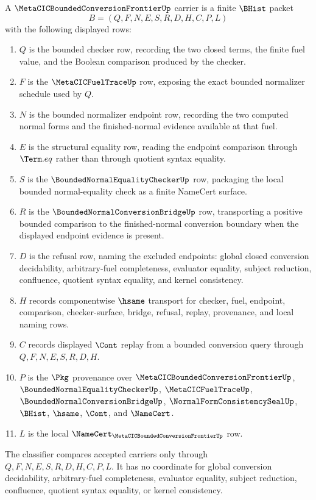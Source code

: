 \begin{definition}
\label{def:metacic-bounded-conversion-frontier-carrier}
A $\MetaCICBoundedConversionFrontierUp$ carrier is a finite $\BHist$ packet
$$
B=(Q,F,N,E,S,R,D,H,C,P,L)
$$
with the following displayed rows:
\begin{enumerate}
\item $Q$ is the bounded checker row, recording the two closed terms, the finite fuel value, and the Boolean comparison produced by the checker.
\item $F$ is the $\MetaCICFuelTraceUp$ row, exposing the exact bounded normalizer schedule used by $Q$.
\item $N$ is the bounded normalizer endpoint row, recording the two computed normal forms and the finished-normal evidence available at that fuel.
\item $E$ is the structural equality row, reading the endpoint comparison through $\Term.eq$ rather than through quotient syntax equality.
\item $S$ is the $\BoundedNormalEqualityCheckerUp$ row, packaging the local bounded normal-equality check as a finite NameCert surface.
\item $R$ is the $\BoundedNormalConversionBridgeUp$ row, transporting a positive bounded comparison to the finished-normal conversion boundary when the displayed endpoint evidence is present.
\item $D$ is the refusal row, naming the excluded endpoints: global closed conversion decidability, arbitrary-fuel completeness, evaluator equality, subject reduction, confluence, quotient syntax equality, and kernel consistency.
\item $H$ records componentwise $\hsame$ transport for checker, fuel, endpoint, comparison, checker-surface, bridge, refusal, replay, provenance, and local naming rows.
\item $C$ records displayed $\Cont$ replay from a bounded conversion query through $Q,F,N,E,S,R,D,H$.
\item $P$ is the $\Pkg$ provenance over $\MetaCICBoundedConversionFrontierUp$, $\BoundedNormalEqualityCheckerUp$, $\MetaCICFuelTraceUp$, $\BoundedNormalConversionBridgeUp$, $\NormalFormConsistencySealUp$, $\BHist$, $\hsame$, $\Cont$, and $\NameCert$.
\item $L$ is the local $\NameCert_{\MetaCICBoundedConversionFrontierUp}$ row.
\end{enumerate}
The classifier compares accepted carriers only through $Q,F,N,E,S,R,D,H,C,P,L$. It has no coordinate for global conversion decidability, arbitrary-fuel completeness, evaluator equality, subject reduction, confluence, quotient syntax equality, or kernel consistency.
\end{definition}

